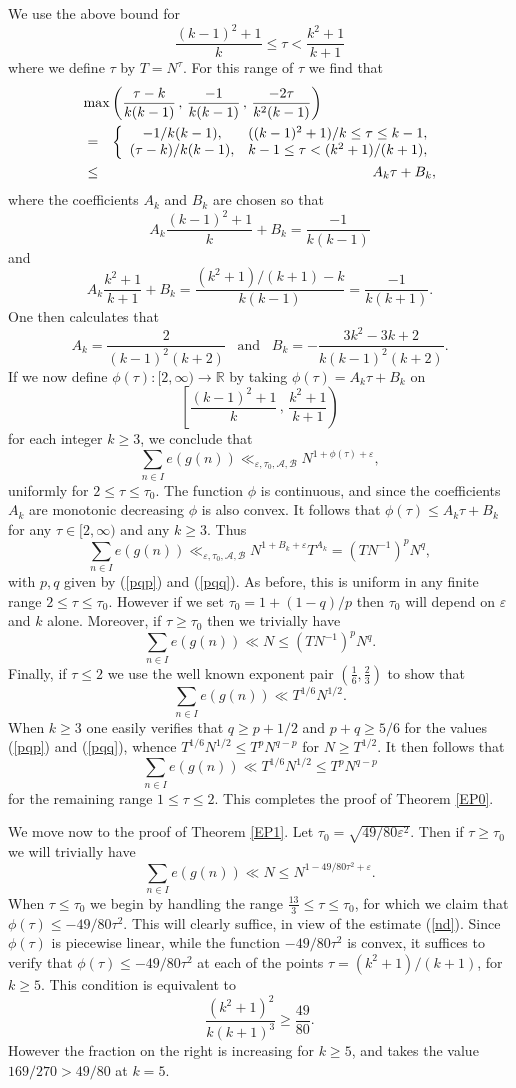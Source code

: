 \documentclass[a4paper,10pt]{article}
\newcommand{\R}{\mathbb{R}}
\newcommand{\ep}{\varepsilon}
\newcommand{\beql}[1]{\begin{equation}\label{#1}}
\newcommand{\eeq}{\end{equation}}
\begin{document}
We use the above bound for 
\[\frac{(k-1)^2+1}{k}\le\tau<\frac{k^2+1}{k+1}\]
where we define $\tau$ by  $T=N^{\tau}$.  For this range of $\tau$ we
find that
\begin{eqnarray}\label{mid}
\lefteqn{\max\left(\frac{\tau-k}{k(k-1)}\,,\,\frac{-1}{k(k-1)}\,,\,
\frac{-2\tau}{k^2(k-1)}\right)}\nonumber\\
&=&\left\{\begin{array}{cc}
-1/k(k-1), & ((k-1)^2+1)/k \le \tau\le k-1,\\
(\tau-k)/k(k-1), & k-1\le\tau<(k^2+1)/(k+1),\end{array}\right.\\
&\le & A_k\tau+B_k,\nonumber
\end{eqnarray}
where the coefficients $A_k$ and $B_k$ are chosen so that
\[A_k\frac{(k-1)^2+1}{k}+B_k=\frac{-1}{k(k-1)}\]
and
\[A_k\frac{k^2+1}{k+1}+B_k=\frac{(k^2+1)/(k+1)-k}{k(k-1)}=\frac{-1}{k(k+1)}.\]
One then calculates that 
\[A_k=\frac{2}{(k-1)^2(k+2)}\;\;\;\mbox{and}\;\;\;
B_k=-\frac{3k^2-3k+2}{k(k-1)^2(k+2)}.\]
If we now define $\phi(\tau):[2,\infty)\to\R$ by taking
$\phi(\tau)=A_k\tau+B_k$ on 
\[\left[\frac{(k-1)^2+1}{k}\,,\,\frac{k^2+1}{k+1}\right)\]
for each integer $k\ge 3$, we conclude that
\beql{nd}
\sum_{n\in I}e(g(n))\ll_{\ep,\tau_0,\mathcal{A},\mathcal{B}}
N^{1+\phi(\tau)+\ep},
\eeq
uniformly for $2\le\tau\le\tau_0$. The function $\phi$ is continuous,
and since the coefficients $A_k$ are monotonic decreasing $\phi$ is
also convex. It follows that $\phi(\tau)\le A_k\tau+B_k$ for any
$\tau\in[2,\infty)$ and any $k\ge 3$. Thus
\[\sum_{n\in I}e(g(n))\ll_{\ep,\tau_0,\mathcal{A},\mathcal{B}}
N^{1+B_k+\ep}T^{A_k}=(TN^{-1})^p N^q,\]
with $p,q$ given by (\ref{pqp}) and (\ref{pqq}). 
As before, this is uniform in any
finite range $2\le\tau\le\tau_0$.  However if we set $\tau_0=1+(1-q)/p$
then $\tau_0$ will depend on $\ep$ and $k$ alone.  Moreover, if
$\tau\ge\tau_0$ then we trivially have
\[\sum_{n\in I}e(g(n))\ll N\le (TN^{-1})^pN^q.\]
Finally, if $\tau\le 2$ we use the well known exponent pair
$(\tfrac16,\tfrac23)$ to show that
\[\sum_{n\in I}e(g(n))\ll T^{1/6}N^{1/2}.\]
When $k\ge 3$ one easily verifies that $q\ge p+1/2$ and $p+q\ge 5/6$
for the values (\ref{pqp}) and (\ref{pqq}), whence $T^{1/6}N^{1/2}\le
T^pN^{q-p}$ for $N\ge T^{1/2}$. It then follows that
\[\sum_{n\in I}e(g(n))\ll T^{1/6}N^{1/2} \le T^pN^{q-p}\]
for the remaining range $1\le\tau\le 2$.  This completes the proof of
Theorem \ref{EP0}.
\bigskip

We move now to the proof of Theorem \ref{EP1}. Let
$\tau_0=\sqrt{49/80\ep^2}$.  Then if $\tau\ge\tau_0$ we will trivially
have
\[\sum_{n\in I}e(g(n))\ll N\le N^{1-49/80\tau^2+\ep}.\]
When $\tau\le\tau_0$ we begin by handling
the range $\tfrac{13}{3}\le\tau\le\tau_0$, for which we claim that
$\phi(\tau)\le -49/80\tau^2$. This will clearly suffice, in view of the
estimate (\ref{nd}). Since $\phi(\tau)$ is piecewise linear, while the
function $-49/80\tau^2$ is convex, it suffices to verify that
$\phi(\tau)\le -49/80\tau^2$ at each of the points
$\tau=(k^2+1)/(k+1)$, for $k\ge 5$. This condition is equivalent to
\[\frac{(k^2+1)^2}{k(k+1)^3}\ge\frac{49}{80}.\]
However the fraction on the right is increasing for $k\ge 5$, and
takes the value $169/270>49/80$ at $k=5$.
\end{document}
